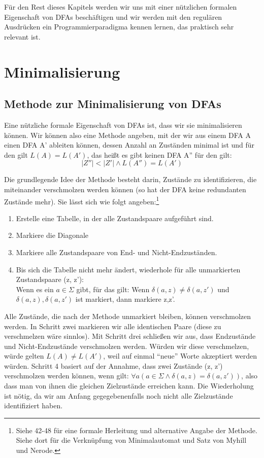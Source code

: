 Für den Rest dieses Kapitels
werden wir uns mit einer nützlichen formalen Eigenschaft von DFAs beschäftigen
und wir werden mit den regulären Ausdrücken ein Programmierparadigma kennen lernen,
das praktisch sehr relevant ist.

\section{Minimalisierung}

\subsection{Methode zur Minimalisierung von DFAs}

Eine nützliche formale Eigenschaft von DFAs ist,
dass wir sie minimalisieren können.
Wir können also eine Methode angeben,
mit der wir aus einem DFA A einen DFA A' ableiten können,
dessen Anzahl an Zuständen minimal ist 
und für den gilt $L(A) = L(A')$,
das heißt es gibt keinen DFA A'' für den gilt:
\[|Z''| < |Z'| \wedge L(A'') = L(A') \]

Die grundlegende Idee der Methode besteht darin,
Zustände zu identifizieren,
die miteinander verschmolzen werden können
(so hat der DFA keine redundanten Zustände mehr).
Sie lässt sich wie folgt angeben:\footnote{
    Siehe \cite{schoening} 42-48
    für eine formale Herleitung und alternative Angabe der Methode.
    Siehe dort für die Verknüpfung von Minimalautomat und Satz von Myhill und Nerode.}

\begin{enumerate}
    \item Erstelle eine Tabelle, in der alle Zustandspaare aufgeführt sind.
    \item Markiere die Diagonale 
    \item Markiere alle Zustandspaare von End- und Nicht-Endzuständen.
    \item Bis sich die Tabelle nicht mehr ändert,
        wiederhole für alle unmarkierten Zustandspaare (z, z'):\\
        Wenn es ein $a \in \Sigma$ gibt,
        für das gilt:
        Wenn $\delta(a,z) \neq \delta(a,z')$ und $\delta(a, z), \delta(a, z')$ ist markiert,
        dann markiere z,z'.
\end{enumerate}

Alle Zustände, die nach der Methode unmarkiert bleiben,
können verschmolzen werden.
In Schritt zwei markieren wir alle identischen Paare
(diese zu verschmelzen wäre sinnlos).
Mit Schritt drei schließen wir aus,
dass Endzustände und Nicht-Endzustände verschmolzen werden. 
Würden wir diese verschmelzen,
würde gelten $L(A) \neq L(A')$,
weil auf einmal ``neue'' Worte akzeptiert werden würden.
Schritt 4 basiert auf der Annahme, dass zwei Zustände (z, z') verschmolzen werden können,
wenn gilt: $\forall a(a \in \Sigma \wedge \delta(a, z) = \delta(a, z'))$,
also dass man von ihnen die gleichen Zielzustände erreichen kann.
Die Wiederholung ist nötig,
da wir am Anfang gegegebenenfalls noch nicht alle Zielzustände identifiziert haben.


